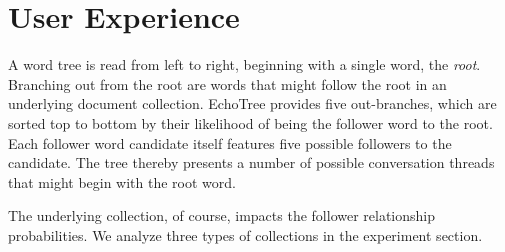 \documentclass{sigchi}
\begin{document}
\section{User Experience}
A word tree\cite{Wattenberg2008} is read from left to right, beginning
with a single word, the {\em root}. Branching out from the root are
words that might follow the root in an underlying document
collection. EchoTree provides five out-branches, which are sorted top
to bottom by their likelihood of being the follower word to the
root. Each follower word candidate itself features five possible
followers to the candidate.  The tree thereby presents a number of
possible conversation threads that might begin with the root word.

The underlying collection, of course, impacts the follower
relationship probabilities. We analyze three types of collections in
the experiment section.
\end{document}
